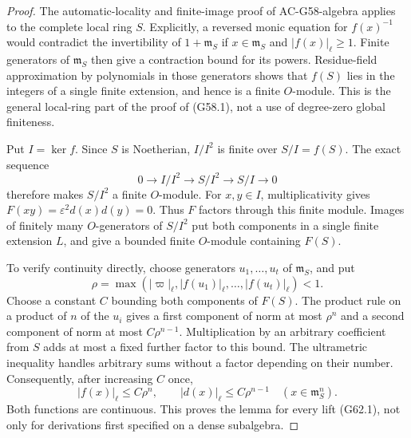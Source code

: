 \begin{proof}
The automatic-locality and finite-image proof of
AC-G58-algebra applies to the complete local ring $S$.
Explicitly, a reversed monic equation for $f(x)^{-1}$
would contradict the invertibility of $1+\mathfrak m_S$
if $x\in\mathfrak m_S$ and $|f(x)|_\ell\ge1$.
Finite generators of $\mathfrak m_S$ then give a
contraction bound for its powers.  Residue-field
approximation by polynomials in those generators shows
that $f(S)$ lies in the integers of a single finite
extension, and hence is a finite $O$-module.  This is
the general local-ring part of the proof of (G58.1),
not a use of degree-zero global finiteness.

Put $I=\ker f$.  Since $S$ is Noetherian, $I/I^2$ is
finite over $S/I=f(S)$.  The exact sequence
\[
 0\longrightarrow I/I^2\longrightarrow S/I^2
                         \longrightarrow S/I\longrightarrow0
                                                               \tag{G62.2}
\]
therefore makes $S/I^2$ a finite $O$-module.
For $x,y\in I$, multiplicativity gives
$F(xy)=\varepsilon^2d(x)d(y)=0$.  Thus $F$ factors
through this finite module.  Images of finitely many
$O$-generators of $S/I^2$ put both components in a
single finite extension $L$, and give a bounded finite
$O$-module containing $F(S)$.

To verify continuity directly, choose generators
$u_1,\ldots,u_t$ of $\mathfrak m_S$, and put
\[
 \rho=\max(|\varpi|_\ell,|f(u_1)|_\ell,\ldots,
                         |f(u_t)|_\ell)<1.
\]
Choose a constant $C$ bounding both components of
$F(S)$.  The product rule on a product of $n$ of the
$u_i$ gives a first component of norm at most
$\rho^n$ and a second component of norm at most
$C\rho^{n-1}$.  Multiplication by an arbitrary
coefficient from $S$ adds at most a fixed further
factor to this bound.  The ultrametric inequality
handles arbitrary sums without a factor depending
on their number.  Consequently, after increasing
$C$ once,
\[
 |f(x)|_\ell\le C\rho^n,\qquad
 |d(x)|_\ell\le C\rho^{n-1}
                  \quad(x\in\mathfrak m_S^n).          \tag{G62.3}
\]
Both functions are continuous.  This proves the
lemma for every lift (G62.1), not only for derivations
first specified on a dense subalgebra.
\end{proof}

